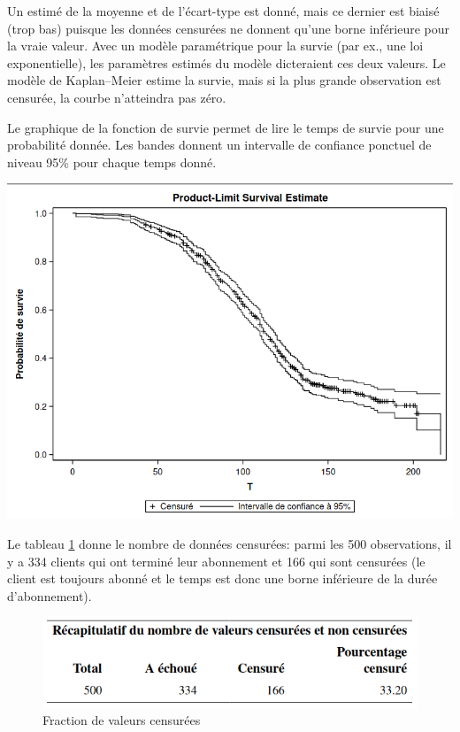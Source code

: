 \documentclass[
  11pt,
  letterpaper,
]{book}
\theoremstyle{definition}
\theoremstyle{definition}
\theoremstyle{definition}
\theoremstyle{remark}
\begin{document}
Un estimé de la moyenne et de l'écart-type est donné, mais ce dernier est biaisé (trop bas) puisque les données censurées ne donnent qu'une borne inférieure pour la vraie valeur. Avec un modèle paramétrique pour la survie (par ex., une loi exponentielle), les paramètres estimés du modèle dicteraient ces deux valeurs. Le modèle de Kaplan--Meier estime la survie, mais si la plus grande observation est censurée, la courbe n'atteindra pas zéro.

Le graphique de la fonction de survie permet de lire le temps de survie pour une probabilité donnée. Les bandes donnent un intervalle de confiance ponctuel de niveau 95\% pour chaque temps donné.

\begin{center}\includegraphics[width=0.9\linewidth]{figures/05-survie-e4} \end{center}

Le tableau \ref{fig:fig5-e5} donne le nombre de données censurées: parmi les 500 observations, il y a 334 clients qui ont terminé leur abonnement et 166 qui sont censurées (le client est toujours abonné et le temps est donc une borne inférieure de la durée d'abonnement).

\begin{figure}

{\centering \includegraphics[width=0.6\linewidth]{figures/05-survie-e5} 

}

\caption{Fraction de valeurs censurées}\label{fig:fig5-e5}
\end{figure}
\end{document}
